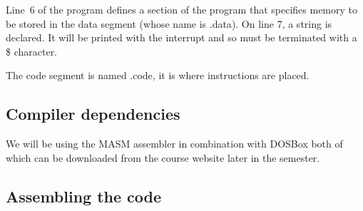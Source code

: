 













Line~6 of the program defines a section of the program that specifies
memory to be stored in the data segment (whose name is {\code
.data}). On line 7, a string is declared. It
will be printed with the interrupt and so must be terminated with a
\$ character.

The code segment  is named {\code .code},
it is where instructions are placed.

\subsection{Compiler dependencies}

We will be using the MASM assembler in combination with DOSBox
both of which can be downloaded from the course website later in the semester.

\subsection{Assembling the code}

